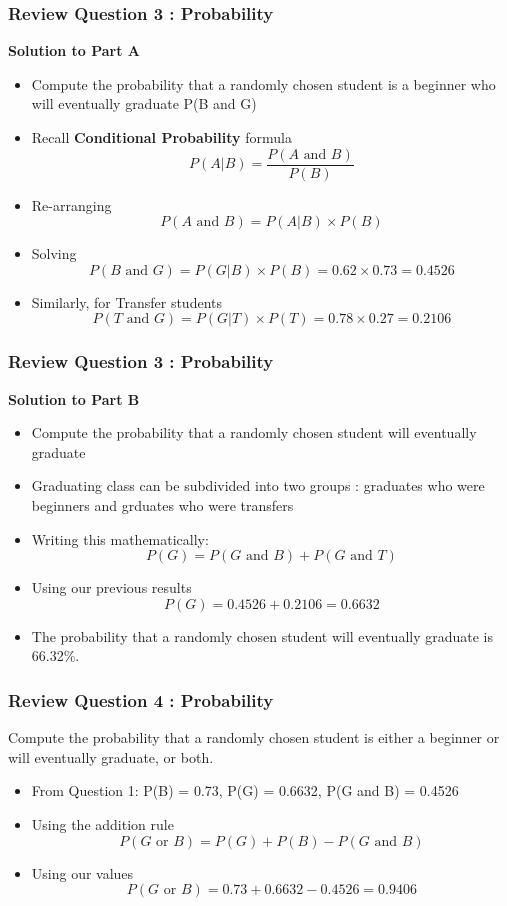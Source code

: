 \documentclass[a4]{beamer}
\begin{document}
\begin{frame}
\frametitle{Review Question 3 :  Probability}
\textbf{Solution to Part A}
\begin{itemize}
\item Compute the probability that a randomly chosen student is a beginner who will
eventually graduate P(B and G)
\item Recall \textbf{Conditional Probability} formula
\[P(A|B) = \frac{P(A \mbox{ and } B)}{P(B)}\]
\item Re-arranging
\[P(A \mbox{ and } B) = P(A|B)\times P(B)  \]
\item Solving
\[P(B \mbox{ and } G) = P(G|B)\times P(B) = 0.62 \times 0.73  = 0.4526 \]
\item Similarly, for Transfer students
\[P(T \mbox{ and } G) = P(G|T)\times P(T) = 0.78 \times 0.27  = 0.2106 \]
\end{itemize}
\end{frame}
\begin{frame}
\frametitle{Review Question 3 :  Probability}
\textbf{Solution to Part B}
\begin{itemize}
\item Compute the probability that a randomly chosen student will eventually graduate
\item Graduating class can be subdivided into two groups : graduates who were beginners and grduates who were transfers
\item Writing this mathematically:
\[P(G) = P(G \mbox{ and } B) + P(G \mbox{ and } T) \]
\item Using our previous results
\[P(G) = 0.4526 + 0.2106 = 0.6632 \]
\item The probability that a randomly chosen student will eventually graduate is 66.32\%.
\end{itemize}
\end{frame}
\begin{frame}
\frametitle{Review Question 4 :  Probability}
Compute the probability that a randomly chosen student is either a beginner or will
eventually graduate, or both.
\begin{itemize}
\item From Question 1: P(B) = 0.73, P(G) = 0.6632, P(G and B) = 0.4526
\item Using the addition rule
\[P(G \mbox{ or } B) = P(G) + P(B) - P(G \mbox{ and } B)\]
\item Using our values
\[P(G \mbox{ or } B) = 0.73 + 0.6632 - 0.4526 = 0.9406\]
\end{itemize}
\end{frame}
\end{document}
